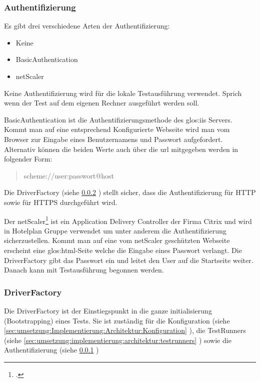 \subsubsection{Authentifizierung}
\label{sec:umsetzung:Implementierung:Architektur:Authentifizierung}
Es gibt drei verschiedene Arten der Authentifizierung:
\begin{itemize}
\item Keine
\item BasicAuthentication
\item netScaler
\end{itemize}

Keine Authentifizierung wird für die lokale Testausführung verwendet. Sprich wenn der Test auf dem eigenen Rechner ausgeführt werden soll.

BasicAuthentication ist die Authentifizierungsmethode des \Gls{glos:iis} Servers. Kommt man auf eine entsprechend Konfigurierte Webseite wird man vom Browser zur Eingabe eines Benutzernamens und Passwort aufgefordert. Alternativ können die beiden Werte auch über die \gls{url} mitgegeben werden in folgender Form:
\begin{quote}
	scheme://user:passwort@host
\end{quote}
Die DriverFactory (siehe \cref{sec:umsetzung:Implementierung:Architektur:DriverFactory} ) stellt sicher, dass die Authentifizierung für HTTP sowie für HTTPS durchgeführt wird.

Der netScaler\footcite{NetScaler} ist ein Application Delivery Controller der Firma Citrix und wird in Hotelplan Gruppe verwendet um unter anderem die Authentifizierung sicherzustellen. Kommt man auf eine vom netScaler geschützten Webseite erscheint eine \Gls{glos:html}-Seite welche die Eingabe eines Passwort verlangt. Die DriverFactory gibt das Passwort ein und leitet den User auf die Startseite weiter. Danach kann mit Testausführung begonnen werden.

\subsubsection{DriverFactory}
\label{sec:umsetzung:Implementierung:Architektur:DriverFactory}
Die DriverFactory ist der Einstiegspunkt in die ganze initialisierung (Bootstrapping) eines Tests. Sie ist zuständig für die Konfiguration (siehe \cref{sec:umsetzung:Implementierung:Architektur:Konfiguration} ), die TestRunners (siehe \cref{sec:umsetzung:implementierung:architektur:testrunners} ) sowie die Authentifizierung (siehe \cref{sec:umsetzung:Implementierung:Architektur:Authentifizierung} )

